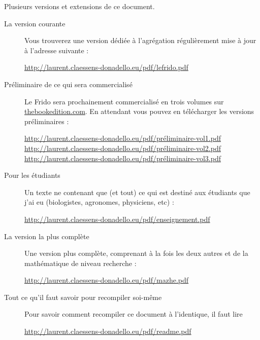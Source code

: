 
\thispagestyle{empty}

Plusieurs versions et extensions de ce document.
\begin{description}

    \item[La version courante] 

        Vous trouverez une version dédiée à l'agrégation régulièrement mise à jour à l'adresse suivante :
        \begin{center}
            \url{http://laurent.claessens-donadello.eu/pdf/lefrido.pdf}
        \end{center}

    \item[Préliminaire de ce qui sera commercialisé]

        Le Frido sera prochainement commercialisé en trois volumes sur \href{http://www.thebookedition.com/fr/}{thebookedition.com}. En attendant vous pouvez en télécharger les versions préliminaires :
        \begin{center}
     \url{http://laurent.claessens-donadello.eu/pdf/préliminaire-vol1.pdf}\\
     \url{http://laurent.claessens-donadello.eu/pdf/préliminaire-vol2.pdf}\\
     \url{http://laurent.claessens-donadello.eu/pdf/préliminaire-vol3.pdf}
        \end{center}
        
    \item[Pour les étudiants]

        Un texte ne contenant que (et tout) ce qui est destiné aux étudiants que j'ai eu (biologistes, agronomes, physiciens, etc) :
        \begin{center}
        \url{http://laurent.claessens-donadello.eu/pdf/enseignement.pdf}
        \end{center}

    \item[La version la plus complète]

        Une version plus complète, comprenant à la fois les deux autres et de la mathématique de niveau recherche : 
        \begin{center}
        \url{http://laurent.claessens-donadello.eu/pdf/mazhe.pdf}
        \end{center}

    \item[Tout ce qu'il faut savoir pour recompiler soi-même]
        Pour savoir comment recompiler ce document à l'identique, il faut lire
        \begin{center}
            \url{http://laurent.claessens-donadello.eu/pdf/readme.pdf}
        \end{center}

\end{description}

